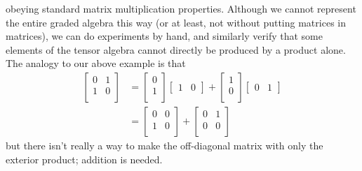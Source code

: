 \documentclass[11pt]{article}
\begin{document}
obeying standard matrix multiplication properties. Although we cannot represent the entire graded algebra this way (or at least, not without putting matrices in matrices), we can do experiments by hand, and similarly verify that some elements of the tensor algebra cannot directly be produced by a product alone. The analogy to our above example is that \begin{align*}
\begin{bmatrix}
	0 & 1\\
	1 & 0\\
\end{bmatrix}
&= \begin{bmatrix}
	0\\
	1\\
\end{bmatrix}
\begin{bmatrix}
	1 & 0
\end{bmatrix} +
\begin{bmatrix}
	1\\
	0\\
\end{bmatrix}
\begin{bmatrix}
	0 & 1
\end{bmatrix} \\
&= \begin{bmatrix}
	0 & 0\\
	1 & 0\\
\end{bmatrix} + \begin{bmatrix}
	0 & 1\\
	0 & 0\\
\end{bmatrix}
\end{align*}
but there isn't really a way to make the off-diagonal matrix with only the exterior product; addition is needed.
\end{document}
